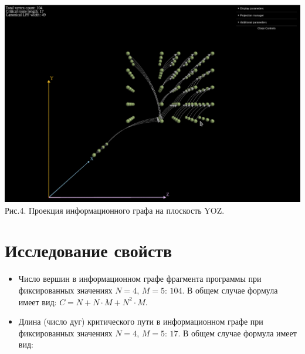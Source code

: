 \documentclass[a4paper, 12pt]{article}
\begin{document}
	\begin{center}
		\includegraphics[scale=0.5]{src/graph_yz.png}\\
		Рис.4. Проекция информационного графа на плоскость YOZ.
	\end{center}

\section{Исследование свойств}

	\begin{itemize}
		\item Число вершин в информационном графе фрагмента программы при фиксированных значениях $N = 4$, $M = 5$: $104$. В общем случае формула имеет вид: $C = N + N \cdot M + N^2 \cdot M$.
		\item Длина (число дуг) критического пути в информационном графе при фиксированных значениях $N = 4$, $M = 5$: $17$. В общем случае формула имеет вид: 
	\end{itemize}
\end{document}
